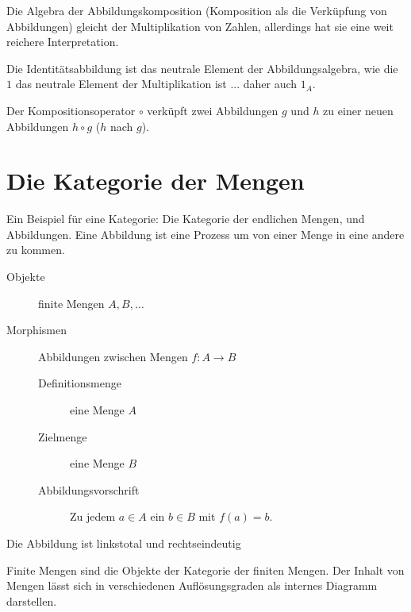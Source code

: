 \documentclass[parskip=half]{scrreprt}
\begin{document}
\begin{remark}
Die Algebra der Abbildungskomposition 
(Komposition als die Verküpfung von Abbildungen)
gleicht der Multiplikation von Zahlen,
allerdings hat sie eine weit reichere Interpretation.
\end{remark}

\begin{remark}
Die Identitätsabbildung ist das neutrale Element der Abbildungsalgebra,
wie die $1$ das neutrale Element der Multiplikation ist ... daher auch $1_A$.
\end{remark}

\begin{remark}
Der Kompositionsoperator $∘$ verküpft zwei Abbildungen $g$ und $h$ zu 
einer neuen Abbildungen $h∘g$ ($h$ nach $g$).
\end{remark}

\chapter{Die Kategorie der Mengen}

Ein Beispiel für eine Kategorie:
Die Kategorie der endlichen Mengen, und Abbildungen.
Eine Abbildung  ist eine Prozess 
um von einer Menge in eine andere zu kommen.

\begin{definition}
\begin{description}
\item[Objekte] finite Mengen $A, B, \dots$
\item[Morphismen] Abbildungen zwischen Mengen $f: A → B$
	\begin{description}
	\item[Definitionsmenge] eine Menge $A$ 
	\item[Zielmenge] eine Menge $B$ 
	\item[Abbildungsvorschrift] Zu jedem $a ∈ A$ ein $b ∈ B$ mit $f(a) = b$.
	\end{description}
\end{description}
\end{definition}

\begin{remark}
Die Abbildung ist linkstotal und rechtseindeutig
\end{remark}

Finite Mengen sind die Objekte der Kategorie der finiten Mengen.
Der Inhalt von Mengen lässt sich in verschiedenen Auflösungsgraden
als internes Diagramm darstellen.
\end{document}
